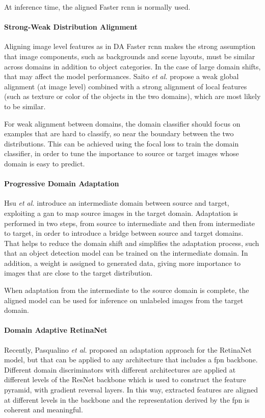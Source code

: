 \documentclass[%
    corpo=12pt,
    twoside,
    stile=classica,   
    tipotesi=magistrale,
    evenboxes,
    english,
	numerazioneromana,
]{toptesi}
\begin{document}
At inference time, the aligned Faster \gls{rcnn} is normally used.

\paragraph{Strong-Weak Distribution Alignment}
Aligning image level features as in DA Faster \acrshort{rcnn} makes the strong assumption that image components, such as backgrounds and scene layouts, must be similar across domains in addition to object categories. In the case of large domain shifts, that may affect the model performances. Saito \emph{et al.}\cite{saito2019strongweak} propose a weak global alignment (at image level) combined with a strong alignment of local features (such as texture or color of the objects in the two domains), which are most likely to be similar.

For weak alignment between domains, the domain classifier should focus on examples that are hard to classify, so near the boundary between the two distributions. This can be achieved using the focal loss to train the domain classifier, in order to tune the importance to source or target images whose domain is easy to predict.

\paragraph{Progressive Domain Adaptation}
Hsu \emph{et al.}\cite{hsu2019progressive} introduce an intermediate domain between source and target, exploiting a \gls{gan} to map source images in the target domain. Adaptation is performed in two steps, from source to intermediate and then from intermediate to target, in order to introduce a bridge between source and target domains. That helps to reduce the domain shift and simplifies the adaptation process, such that an object detection model can be trained on the intermediate domain. In addition, a weight is assigned to generated data, giving more importance to images that are close to the target distribution.

When adaptation from the intermediate to the source domain is complete, the aligned model can be used for inference on unlabeled images from the target domain.

\paragraph{Domain Adaptive RetinaNet}\label{sec:daretinanet}
Recently, Pasqualino \emph{et al.}\cite{pasqualino2020unsupervised} proposed an adaptation approach for the RetinaNet model, but that can be applied to any architecture that includes a \gls{fpn} backbone. Different domain discriminators with different architectures are applied at different levels of the ResNet backbone which is used to construct the feature pyramid, with gradient reversal layers. In this way, extracted features are aligned at different levels in the backbone and the representation derived by the \gls{fpn} is coherent and meaningful.
\end{document}
